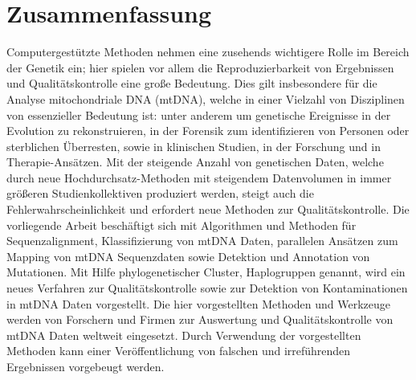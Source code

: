 \cleardoublepage
\thispagestyle{empty}
\hspace*{7cm}
\section*{Zusammenfassung}
Computergestützte Methoden nehmen eine zusehends wichtigere Rolle im Bereich der Genetik ein; hier spielen vor allem die Reproduzierbarkeit von Ergebnissen und Qualit\"atskontrolle eine gro{\ss}e Bedeutung. Dies gilt insbesondere für die Analyse mitochondriale DNA (mtDNA), welche in einer Vielzahl von Disziplinen von essenzieller Bedeutung ist: unter anderem um genetische Ereignisse in der Evolution zu rekonstruieren, in der Forensik zum identifizieren von Personen oder sterblichen \"Uberresten, sowie in klinischen Studien, in der Forschung und in Therapie-Ans\"atzen. Mit der steigende Anzahl von genetischen Daten, welche durch neue Hochdurchsatz-Methoden mit steigendem Datenvolumen in immer gr\"o{\ss}eren Studienkollektiven produziert werden, steigt auch die Fehlerwahrscheinlichkeit und erfordert neue Methoden zur Qualit\"atskontrolle. Die vorliegende Arbeit besch\"aftigt sich mit Algorithmen und Methoden für Sequenzalignment, Klassifizierung von mtDNA Daten, parallelen Ansätzen zum Mapping von mtDNA Sequenzdaten sowie Detektion und Annotation von Mutationen. Mit Hilfe phylogenetischer Cluster, Haplogruppen genannt, wird ein neues Verfahren zur Qualit\"atskontrolle sowie zur Detektion von Kontaminationen in mtDNA Daten vorgestellt. Die hier vorgestellten Methoden und Werkzeuge werden von Forschern und Firmen zur Auswertung und Qualitätskontrolle von mtDNA Daten weltweit eingesetzt. Durch Verwendung der vorgestellten Methoden kann einer Ver\"offentlichung von falschen und irref\"uhrenden Ergebnissen vorgebeugt werden. 



